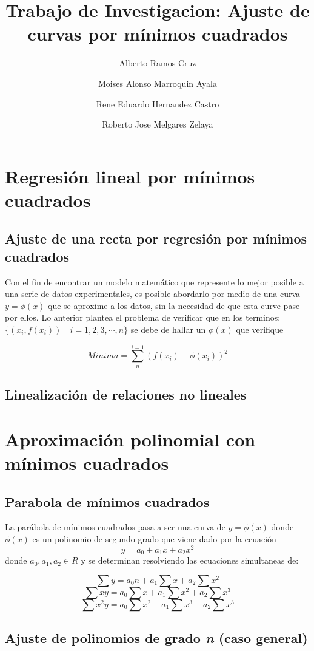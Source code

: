 \documentclass[11pt,letterpaper]{article}
\begin{document}
\title{Trabajo de Investigacion: Ajuste de curvas por mínimos cuadrados}

\author{
	Alberto Ramos Cruz
	\and Moises Alonso Marroquin Ayala
	\and Rene Eduardo Hernandez Castro
	\and Roberto Jose Melgares Zelaya
}
\maketitle

\section{Regresión lineal por mínimos cuadrados}
\subsection{Ajuste de una recta por regresión por mínimos cuadrados}
Con el fin de encontrar un modelo matemático que represente lo mejor posible a una serie de datos experimentales, es posible abordarlo por medio de una curva $y=\phi(x)$ que se aproxime a los datos, sin la necesidad de que esta curve pase por ellos.
Lo anterior plantea el problema de verificar que en los terminos:
$\{(x_i, f(x_i))\quad i = 1,2,3, \cdots, n\} $ se debe de hallar un $\phi(x)$ que verifique

$$Minima = \sum_{n}^{i=1} (f(x_i) - \phi(x_i))^2$$
\subsection{Linealización de relaciones no lineales}

\section{Aproximación polinomial con mínimos cuadrados}
\subsection{Parabola de mínimos cuadrados}
La parábola de mínimos cuadrados pasa a ser una curva de $y=\phi(x)$ donde $\phi(x)$ es un polinomio de segundo grado que viene dado por la ecuación
$$y = a_0 + a_1 x + a_2 x^2  $$
donde $a_0, a_1, a_2 \in R$ y se determinan resolviendo las ecuaciones simultaneas de:

$$\sum y = a_0n + a_1\sum x + a_2\sum x^2$$
$$\sum xy = a_0\sum x + a_1\sum x^2 + a_2\sum x^3$$
$$\sum x^2y = a_0\sum x^2 + a_1\sum x^3 + a_2\sum x^3$$

\subsection{Ajuste de polinomios de grado \textit{n}	 (caso general)}
\end{document}
